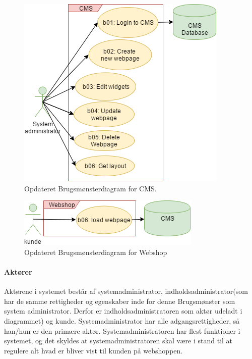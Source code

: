 \begin{figure}[H]
  \includegraphics[width=\linewidth]{elaborationsdokumentet/figurer/krav/UC-CMS.png}
  \caption{Opdateret Brugsmønsterdiagram for CMS.}
  \label{UC-CMS}
\end{figure}

\begin{figure}[H]
  \includegraphics[width=\linewidth]{elaborationsdokumentet/figurer/krav/UC-Webshop.png}
  \caption{Opdateret Brugsmønsterdiagram for Webshop}
  \label{UC-Webshop}
\end{figure}
\FloatBarrier
\onecolumn

\paragraph{Aktører}
Aktørene i systemet består af systemadministrator, indholdsadministrator(som har de samme rettigheder og egenskaber inde for denne Brugsmønster som system administrator. Derfor er indholdsadministratoren som aktør udeladt i diagrammet) og kunde.
Systemadministrator har alle adgangsrettigheder, så han/hun er den primære aktør. 
Systemadministratoren har flest funktioner i systemet, og det skyldes at systemadministratoren skal være i stand til at regulere alt hvad er bliver vist til kunden på webshoppen.


